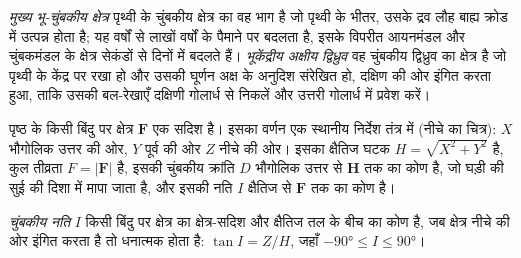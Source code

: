 \begin{definition}[मुख्य भू-चुंबकीय क्षेत्र; भूकेंद्रीय अक्षीय द्विध्रुव]\label{def:b3:palaeomagnetism:main-field}
\emph{मुख्य भू-चुंबकीय क्षेत्र} पृथ्वी के चुंबकीय क्षेत्र का वह भाग है जो
पृथ्वी के भीतर, उसके द्रव लौह बाह्य क्रोड में उत्पन्न होता है;
यह वर्षों से लाखों वर्षों के पैमाने पर बदलता है, इसके विपरीत आयनमंडल और
चुंबकमंडल के क्षेत्र सेकंडों से दिनों में बदलते हैं।
\emph{भूकेंद्रीय अक्षीय द्विध्रुव} वह चुंबकीय द्विध्रुव का क्षेत्र है जो
पृथ्वी के केंद्र पर रखा हो और उसकी घूर्णन अक्ष के अनुदिश संरेखित हो, दक्षिण की ओर इंगित करता हुआ, ताकि उसकी
बल-रेखाएँ दक्षिणी गोलार्ध से निकलें और
उत्तरी गोलार्ध में प्रवेश करें।
\end{definition}

पृष्ठ के किसी बिंदु पर क्षेत्र $\mathbf F$ एक सदिश है। इसका वर्णन
एक स्थानीय निर्देश तंत्र में (नीचे का चित्र): $X$ भौगोलिक उत्तर की ओर, $Y$ पूर्व की ओर
$Z$ नीचे की ओर। इसका क्षैतिज घटक $H = \sqrt{X^2 + Y^2}$ है,
कुल तीव्रता $F = |\mathbf F|$ है, इसकी चुंबकीय क्रांति $D$ भौगोलिक उत्तर से $\mathbf H$ तक का कोण है,
जो घड़ी की सुई की दिशा में मापा जाता है, और इसकी नति $I$
क्षैतिज से $\mathbf F$ तक का कोण है।

\begin{definition}[चुंबकीय नति]\label{def:b3:palaeomagnetism:inclination}
\emph{चुंबकीय नति} $I$ किसी बिंदु पर क्षेत्र का
क्षेत्र-सदिश और क्षैतिज तल के बीच का कोण है,
जब क्षेत्र नीचे की ओर इंगित करता है तो धनात्मक होता है: $\tan I = Z/H$, जहाँ $-\ang{90} \le I
\le \ang{90}$।
\end{definition}

